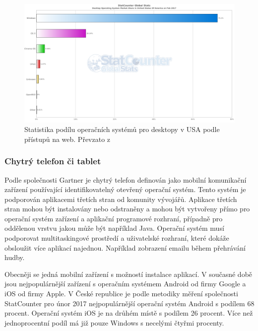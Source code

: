  \begin{figure}[h]
\includegraphics[width=13cm]{img/StatCounter_Destop_USA}
\caption{Statistika podílu operačních systémů pro desktopy v USA podle přístupů na web. Převzato z \cite{http://gs.statcounter.com/os-market-share/mobile-tablet/czech-republic/}} 
\centering
\end{figure}
 
 
 \subsubsection{Chytrý telefon či tablet}
 Podle společnosti Gartner  je chytrý telefon definován jako mobilní komunikační zařízení používající identifikovatelný otevřený operační systém. Tento systém je podporován aplikacemi třetích stran od komunity vývojářů. Aplikace třetích stran mohou být instalovány nebo odstraněny a mohou být vytvořeny přímo pro operační systém zařízení a aplikační programové rozhraní, případně pro oddělenou vrstvu jakou může být například Java. Operační systém musí podporovat multitaskingové prostředí a uživatelské rozhraní, které dokáže obsloužit více aplikací najednou. Například zobrazení emailu během přehrávání hudby.
 
 Obecněji se jedná mobilní zařízení s možností instalace aplikací. V současné době jsou nejpopulárnější zařízení s operačním systémem Android od firmy Google a iOS od firmy Apple. V České republice je podle metodiky měření společnosti StatCounter pro únor 2017 nejpopulárnější operační systém Android s podílem 68 procent. Operační systém iOS je na drůhém místě s podílem 26 procent. Více než jednoprocentní podíl má již pouze Windows s necelými čtyřmi procenty. 
 
